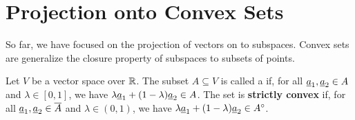 \section{Projection onto Convex Sets}

So far, we have focused on the projection of vectors on to subspaces.
Convex sets are generalize the closure property of subspaces to subsets of points.

\begin{definition}
Let $V$ be a vector space over $\mathbb{R}$.
The subset $A \subseteq V$ is called a  if, for all $\underline{a}_1,\underline{a}_2 \in A$ and $\lambda\in[0,1]$, we have $\lambda \underline{a}_1 + (1-\lambda) \underline{a}_2 \in A$.
The set is \textbf{strictly convex} if, for all $\underline{a}_1,\underline{a}_2 \in \overline{A}$ and $\lambda\in(0,1)$, we have $\lambda \underline{a}_1 + (1-\lambda) \underline{a}_2 \in {A}^{\circ}$.
\end{definition}


